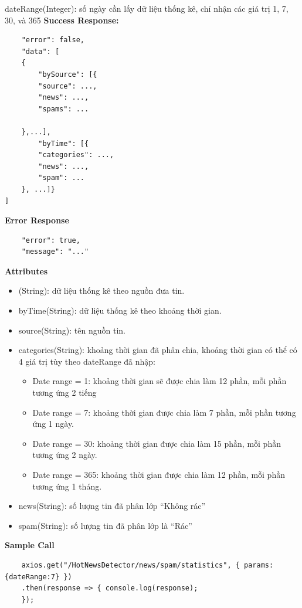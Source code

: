 dateRange(Integer): số ngày cần lấy dữ liệu thống kê, chỉ nhận các giá trị 1, 7, 30, và 365
\textbf{Success Response:}	
\begin{lstlisting}
	"error": false,
	"data": [
	{
		"bySource": [{
		"source": ...,
		"news": ...,
		"spams": ...
	
	},...],
		"byTime": [{
		"categories": ...,
		"news": ...,
		"spam": ...
	}, ...]}
]
\end{lstlisting}
\textbf{Error Response}
\begin{lstlisting}
	"error": true,		
	"message": "..."
\end{lstlisting}
\textbf{Attributes}
\begin{itemize}
	\item (String): dữ liệu thống kê theo nguồn đưa tin.
	\item byTime(String): dữ liệu thống kê theo khoảng thời gian.
	\item source(String): tên nguồn tin.
	\item categories(String): khoảng thời gian đã phân chia, khoảng thời gian có thể có 4 giá trị tùy theo dateRange đã nhập:
	\begin{itemize}
		\item Date range = 1: khoảng thời gian sẽ được chia làm 12 phần, mỗi phần tương ứng 2 tiếng
		\item 	Date range = 7: khoảng thời gian được chia làm 7 phần, mỗi phần tương ứng 1 ngày.
		\item 	Date range = 30: khoảng thời gian được chia làm 15 phần, mỗi phần tương ứng 2 ngày.
		\item 	Date range = 365: khoảng thời gian được chia làm 12 phần, mỗi phần tương ứng 1 tháng.
	\end{itemize}
	\item news(String): số lượng tin đã phân lớp “Không rác”
	\item spam(String): số lượng tin đã phân lớp là “Rác”
\end{itemize}	
\textbf{Sample Call}
\begin{lstlisting}
	axios.get("/HotNewsDetector/news/spam/statistics", { params:{dateRange:7} })
	.then(response => { console.log(response);
	}); 

\end{lstlisting}

